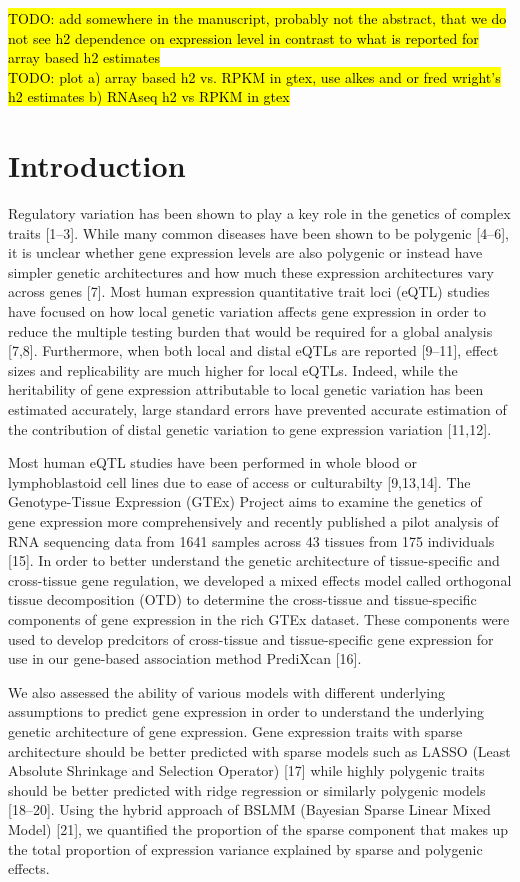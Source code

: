 \documentclass[]{article}
\begin{document}
\hl{TODO: add somewhere in the manuscript, probably not the abstract, that we do not see h2 dependence on expression level in contrast to what is reported for array based h2 estimates}\\
\hl{TODO: plot a) array based h2 vs. RPKM in gtex, use alkes and or fred wright's h2 estimates b) RNAseq h2 vs RPKM in gtex}

\section{Introduction}\label{introduction}

Regulatory variation has been shown to play a key role in the genetics
of complex traits {[}1--3{]}. While many common diseases have been shown
to be polygenic {[}4--6{]}, it is unclear whether gene expression levels
are also polygenic or instead have simpler genetic architectures and how
much these expression architectures vary across genes {[}7{]}. Most
human expression quantitative trait loci (eQTL) studies have focused on
how local genetic variation affects gene expression in order to reduce
the multiple testing burden that would be required for a global analysis
{[}7,8{]}. Furthermore, when both local and distal eQTLs are reported
{[}9--11{]}, effect sizes and replicability are much higher for local
eQTLs. Indeed, while the heritability of gene expression attributable to
local genetic variation has been estimated accurately, large standard
errors have prevented accurate estimation of the contribution of distal
genetic variation to gene expression variation {[}11,12{]}.

Most human eQTL studies have been performed in whole blood or
lymphoblastoid cell lines due to ease of access or culturabilty
{[}9,13,14{]}. The Genotype-Tissue Expression (GTEx) Project aims to
examine the genetics of gene expression more comprehensively and
recently published a pilot analysis of RNA sequencing data from 1641
samples across 43 tissues from 175 individuals {[}15{]}. In order to
better understand the genetic architecture of tissue-specific and
cross-tissue gene regulation, we developed a mixed effects model called
orthogonal tissue decomposition (OTD) to determine the cross-tissue and
tissue-specific components of gene expression in the rich GTEx dataset.
These components were used to develop predcitors of cross-tissue and
tissue-specific gene expression for use in our gene-based association
method PrediXcan {[}16{]}.

We also assessed the ability of various models with different underlying
assumptions to predict gene expression in order to understand the
underlying genetic architecture of gene expression. Gene expression
traits with sparse architecture should be better predicted with sparse
models such as LASSO (Least Absolute Shrinkage and Selection Operator)
{[}17{]} while highly polygenic traits should be better predicted with
ridge regression or similarly polygenic models {[}18--20{]}. Using the
hybrid approach of BSLMM (Bayesian Sparse Linear Mixed Model) {[}21{]},
we quantified the proportion of the sparse component that makes up the
total proportion of expression variance explained by sparse and
polygenic effects.
\end{document}
